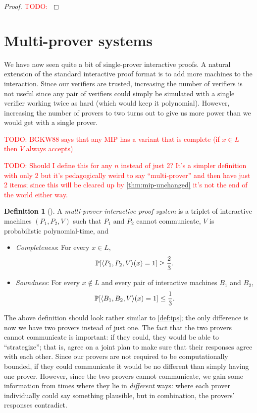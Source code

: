 \documentclass[english,12pt]{reedthesis}
\theoremstyle{plain}
\theoremstyle{definition}
\newtheorem{defn}[defn]{Definition}
\theoremstyle{remark}
\DeclarePairedDelimiter{\ang}{\langle}{\rangle}
\newcommand{\TODO}[1]{\textcolor{red}{TODO: #1}}
\begin{document}
\begin{proof}
  \TODO{}
\end{proof}

\section{Multi-prover systems}\label{sec:multi-prover}

We have now seen quite a bit of single-prover interactive proofs. A natural
extension of the standard interactive proof format is to add more machines to
the interaction. Since our verifiers are trusted, increasing the number of
verifiers is not useful since any pair of verifiers could simply be simulated
with a single verifier working twice as hard (which would keep it polynomial).
However, increasing the number of provers to two turns out to give us more power
than we would get with a single prover.

\TODO{BGKW88 says that any MIP has a variant that is complete (if $x \in L$ then
  $V$ always accepts)}

\TODO{Should I define this for any $n$ instead of just 2? It's a simpler
  definition with only 2 but it's pedagogically weird to say ``multi-prover''
  and then have just 2 items; since this will be cleared up by
  \cref{thm:mip-unchanged} it's not the end of the world either way.}
\begin{defn}[{\cite[Def.\ 4.11.2]{Go01}}]\label{def:mps}
  A \emph{multi-prover interactive proof system} is a triplet of interactive
  machines $(P_{1}, P_{2}, V)$ such that $P_{1}$ and $P_{2}$ cannot communicate,
  $V$ is probabilistic polynomial-time, and
  \begin{itemize}
    \item \emph{Completeness}: For every $x \in L$,
          \[
            \mathbb{P}[\ang{P_{1}, P_{2}, V}(x) = 1] \ge \frac{2}{3}.
          \]
    \item \emph{Soundness}: For every $x \notin L$ and every pair of interactive
          machines $B_{1}$ and $B_{2}$,
          \[
            \mathbb{P}[\ang{B_{1}, B_{2}, V}(x) = 1] \le \frac{1}{3}.
          \]
  \end{itemize}
\end{defn}

The above definition should look rather similar to \cref{def:ips}; the only
difference is now we have two provers instead of just one. The fact that the two
provers cannot communicate is important: if they could, they would be able to
``strategize''; that is, agree on a joint plan to make sure that their responses
agree with each other. Since our provers are not required to be computationally
bounded, if they could communicate it would be no different than simply having
one prover. However, since the two provers cannot communicate, we gain some
information from times where they lie in \emph{different} ways: where each
prover individually could say something plausible, but in combination, the
provers' responses contradict.
\end{document}
